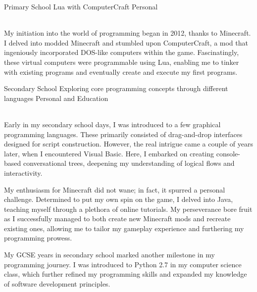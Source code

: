 


\begin{entrylist}
	\entry
		{Primary School}
		{Lua with ComputerCraft}
		{Personal}
		{\\
			My initiation into the world of programming began in 2012, thanks to Minecraft. I delved into modded Minecraft and stumbled upon ComputerCraft, a mod that ingeniously incorporated DOS-like computers within the game. Fascinatingly, these virtual computers were programmable using Lua, enabling me to tinker with existing programs and eventually create and execute my first programs.

			\vspace{0.5cm}
		}
	\entry
		{Secondary School}
		{Exploring core programming concepts through different languages}
		{Personal and Education}
		{\\
			Early in my secondary school days, I was introduced to a few graphical programming languages. These primarily consisted of drag-and-drop interfaces designed for script construction. However, the real intrigue came a couple of years later, when I encountered Visual Basic. Here, I embarked on creating console-based conversational trees, deepening my understanding of logical flows and interactivity.

			\vspace{0.5cm}

			My enthusiasm for Minecraft did not wane; in fact, it spurred a personal challenge. Determined to put my own spin on the game, I delved into Java, teaching myself through a plethora of online tutorials. My perseverance bore fruit as I successfully managed to both create new Minecraft mods and recreate existing ones, allowing me to tailor my gameplay experience and furthering my programming prowess.

			\vspace{0.5cm}

			My GCSE years in secondary school marked another milestone in my programming journey. I was introduced to Python 2.7 in my computer science class, which further refined my programming skills and expanded my knowledge of software development principles.

			\vspace{0.5cm}


}
\end{entrylist}
